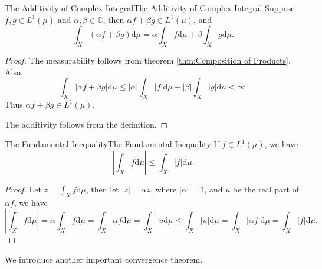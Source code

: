 \documentclass[../main.tex]{subfiles}
\begin{document}
\begin{theorem}{The Additivity of Complex Integral}{The Additivity of Complex Integral}
	Suppose $f,g\in L^1(\mu)$ and $\alpha,\beta\in \mathbb{C}$, then $\alpha f + \beta g \in L^1(\mu)$, and
	\begin{equation}
	\int_X (\alpha f + \beta g) \mathrm{d} \mu = \alpha \int_X f \mathrm{d} \mu + \beta \int_X g \mathrm{d} \mu.
	\end{equation}
\end{theorem}
\begin{proof}
	The measurability follows from theorem \ref{thm:Composition of Products}. Also,
	\begin{equation*}
		\int_X \left|\alpha f+\beta g\right| \mathrm{d} \mu \leq \left|\alpha\right| \int_X \left|f\right| \mathrm{d} \mu + \left|\beta\right| \int_X \left|g\right| \mathrm{d} \mu < \infty.
	\end{equation*}
	Thus $\alpha f + \beta g \in L^1(\mu)$.
	
	The additivity follows from the definition.
\end{proof}

\begin{theorem}{The Fundamental Inequality}{The Fundamental Inequality}
	If $f\in L^1(\mu)$, we have
	\begin{equation}
	\left| \int_X f \mathrm{d} \mu \right| \leq \int_X \left|f\right| \mathrm{d} \mu.
	\end{equation}
\end{theorem}
\begin{proof}
Let $z=\int_X f \mathrm{d} \mu$, then let $\left|z\right| = \alpha z$, where $\left|\alpha\right| = 1$, and $u$ be the real part of $\alpha f$, we have
\begin{equation*}
	\left|\int_X f \mathrm{d} \mu\right| = \alpha \int_X f \mathrm{d} \mu = \int_X \alpha f \mathrm{d} \mu = \int_X u \mathrm{d} \mu \leq \int_X \left|u\right| \mathrm{d} \mu = \int_X \left|\alpha f\right| \mathrm{d} \mu = \int_X \left|f\right| \mathrm{d} \mu.
\end{equation*}
\end{proof}


We introduce another important convergence theorem.
\end{document}
